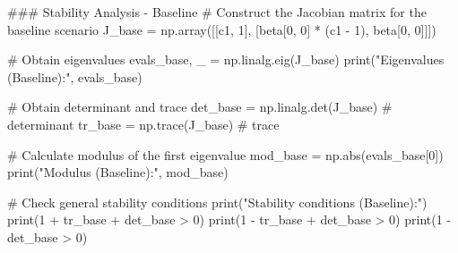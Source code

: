 \documentclass[
  letterpaper,
  DIV=11,
  numbers=noendperiod]{scrreprt}
\newenvironment{Shaded}{\begin{snugshade}}{\end{snugshade}}
\newcommand{\BuiltInTok}[1]{\textcolor[rgb]{0.00,0.23,0.31}{#1}}
\newcommand{\CommentTok}[1]{\textcolor[rgb]{0.37,0.37,0.37}{#1}}
\newcommand{\DecValTok}[1]{\textcolor[rgb]{0.68,0.00,0.00}{#1}}
\newcommand{\NormalTok}[1]{\textcolor[rgb]{0.00,0.23,0.31}{#1}}
\newcommand{\OperatorTok}[1]{\textcolor[rgb]{0.37,0.37,0.37}{#1}}
\newcommand{\StringTok}[1]{\textcolor[rgb]{0.13,0.47,0.30}{#1}}
\begin{document}
\begin{tcolorbox}[enhanced jigsaw, titlerule=0mm, breakable, bottomrule=.15mm, toprule=.15mm, colbacktitle=quarto-callout-note-color!10!white, rightrule=.15mm, toptitle=1mm, opacityback=0, left=2mm, coltitle=black, title=\textcolor{quarto-callout-note-color}{\faInfo}\hspace{0.5em}{Python code}, colframe=quarto-callout-note-color-frame, opacitybacktitle=0.6, leftrule=.75mm, bottomtitle=1mm, arc=.35mm, colback=white]

\begin{Shaded}
\begin{Highlighting}[]
\CommentTok{\#\#\# Stability Analysis {-} Baseline}
\CommentTok{\# Construct the Jacobian matrix for the baseline scenario}
\NormalTok{J\_base }\OperatorTok{=}\NormalTok{ np.array([[c1, }\DecValTok{1}\NormalTok{],}
\NormalTok{                   [beta[}\DecValTok{0}\NormalTok{, }\DecValTok{0}\NormalTok{] }\OperatorTok{*}\NormalTok{ (c1 }\OperatorTok{{-}} \DecValTok{1}\NormalTok{), beta[}\DecValTok{0}\NormalTok{, }\DecValTok{0}\NormalTok{]]])}

\CommentTok{\# Obtain eigenvalues}
\NormalTok{evals\_base, \_ }\OperatorTok{=}\NormalTok{ np.linalg.eig(J\_base)}
\BuiltInTok{print}\NormalTok{(}\StringTok{"Eigenvalues (Baseline):"}\NormalTok{, evals\_base)}

\CommentTok{\# Obtain determinant and trace}
\NormalTok{det\_base }\OperatorTok{=}\NormalTok{ np.linalg.det(J\_base)  }\CommentTok{\# determinant}
\NormalTok{tr\_base }\OperatorTok{=}\NormalTok{ np.trace(J\_base)  }\CommentTok{\# trace}

\CommentTok{\# Calculate modulus of the first eigenvalue}
\NormalTok{mod\_base }\OperatorTok{=}\NormalTok{ np.}\BuiltInTok{abs}\NormalTok{(evals\_base[}\DecValTok{0}\NormalTok{])}
\BuiltInTok{print}\NormalTok{(}\StringTok{"Modulus (Baseline):"}\NormalTok{, mod\_base)}

\CommentTok{\# Check general stability conditions}
\BuiltInTok{print}\NormalTok{(}\StringTok{"Stability conditions (Baseline):"}\NormalTok{)}
\BuiltInTok{print}\NormalTok{(}\DecValTok{1} \OperatorTok{+}\NormalTok{ tr\_base }\OperatorTok{+}\NormalTok{ det\_base }\OperatorTok{\textgreater{}} \DecValTok{0}\NormalTok{)}
\BuiltInTok{print}\NormalTok{(}\DecValTok{1} \OperatorTok{{-}}\NormalTok{ tr\_base }\OperatorTok{+}\NormalTok{ det\_base }\OperatorTok{\textgreater{}} \DecValTok{0}\NormalTok{)}
\BuiltInTok{print}\NormalTok{(}\DecValTok{1} \OperatorTok{{-}}\NormalTok{ det\_base }\OperatorTok{\textgreater{}} \DecValTok{0}\NormalTok{)}


\end{Highlighting}
\end{Shaded}
\end{tcolorbox}
\end{document}
